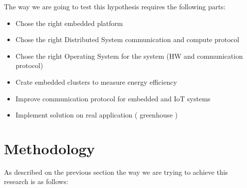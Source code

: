 The way we are going to test this hypothesis requires the following parts:


\begin{itemize}
\item Chose the right embedded platform 
\item Chose the right Distributed System communication and compute protocol
\item Chose the right Operating System for the system (HW and communication protocol) 
\item Crate embedded clusters to measure energy efficiency
\item Improve communication protocol for embedded and IoT systems
\item Implement solution on real application ( greenhouse )
\end{itemize}

\section{Methodology}
\noindent

As described on the previous section the way we are trying to achieve this
research is as follows: 



